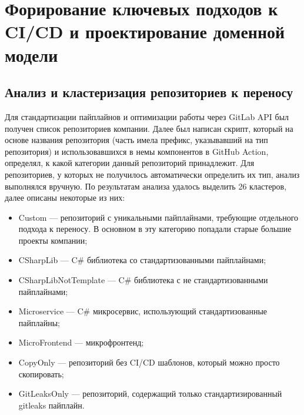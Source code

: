 \chapter{Форирование ключевых подходов к CI/CD и проектирование доменной модели} \label{ch:ch2}

\section{Анализ и кластеризация репозиториев к переносу} \label{sec:repository-analysis}
Для стандартизации пайплайнов и оптимизации работы через GitLab API был получен список репозиториев компании.
Далее был написан скрипт,
который на основе названия репозитория (часть имела префикс, указывавший на тип репозитория) и использовавшихся в немы компонентов в GitHub Action,
определял, к какой категории данный репозиторий принадлежит.
Для репозиториев, у которых не получилось автоматически определить их тип, анализ выполнялся вручную.
По результатам анализа удалось выделить 26 кластеров, далее описаны некоторые из них:
\begin{itemize}
  \item Custom — репозиторий с уникальными пайплайнами, требующие отдельного подхода к переносу.
        В основном в эту категорию попадали старые большие проекты компании;
  \item CSharpLib — C\# библиотека со стандартизованными пайплайнами;
  \item CSharpLibNotTemplate — C\# библиотека с не стандартизованными пайплайнами;
  \item Microservice — C\# микросервис, использующий стандартизованные пайплайны;
  \item MicroFrontend — микрофронтенд;
  \item CopyOnly — репозиторий без CI/CD шаблонов, который можно просто скопировать;
  \item GitLeaksOnly — репозиторий, содержащий  только стандартизированный gitleaks пайплайн.
\end{itemize}

